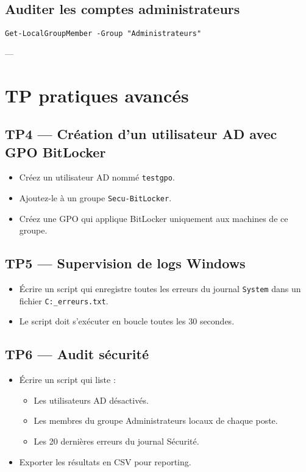 \documentclass[a4paper,12pt]{article}
\begin{document}
\subsection{Auditer les comptes administrateurs}
\begin{verbatim}
Get-LocalGroupMember -Group "Administrateurs"
\end{verbatim}

---

\section{TP pratiques avancés}
\subsection{TP4 — Création d’un utilisateur AD avec GPO BitLocker}
\begin{itemize}
  \item Créez un utilisateur AD nommé \texttt{testgpo}.
  \item Ajoutez-le à un groupe \texttt{Secu-BitLocker}.
  \item Créez une GPO qui applique BitLocker uniquement aux machines de ce groupe.
\end{itemize}

\subsection{TP5 — Supervision de logs Windows}
\begin{itemize}
  \item Écrire un script qui enregistre toutes les erreurs du journal \texttt{System} dans un fichier \texttt{C:\Logs\system\_erreurs.txt}.
  \item Le script doit s’exécuter en boucle toutes les 30 secondes.
\end{itemize}

\subsection{TP6 — Audit sécurité}
\begin{itemize}
  \item Écrire un script qui liste :
  \begin{itemize}
    \item Les utilisateurs AD désactivés.
    \item Les membres du groupe Administrateurs locaux de chaque poste.
    \item Les 20 dernières erreurs du journal Sécurité.
  \end{itemize}
  \item Exporter les résultats en CSV pour reporting.
\end{itemize}
\end{document}
